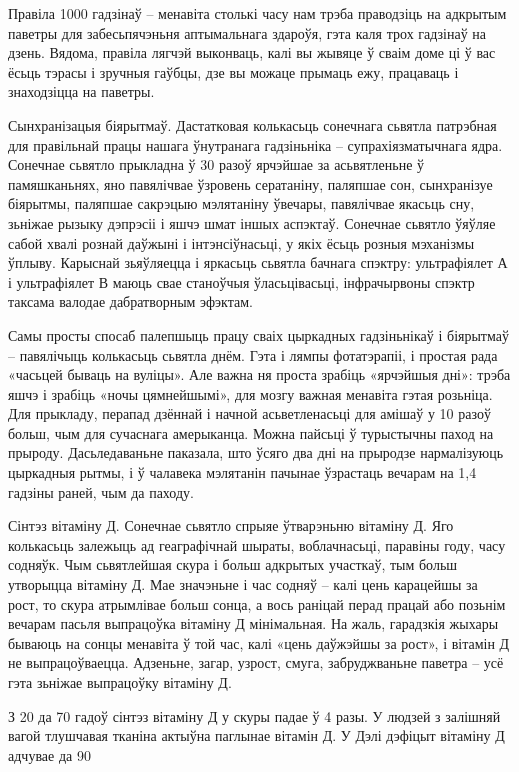 Правіла 1000 гадзінаў – менавіта столькі часу нам трэба праводзіць на адкрытым паветры для забесьпячэньня аптымальнага здароўя, гэта каля трох гадзінаў на дзень. Вядома, правіла лягчэй выконваць, калі вы жывяце ў сваім доме ці ў вас ёсьць тэрасы і зручныя гаўбцы, дзе вы можаце прымаць ежу, працаваць і знаходзіцца на паветры.

Сынхранізацыя біярытмаў. Дастатковая колькасьць сонечнага сьвятла патрэбная для правільнай працы нашага ўнутранага гадзіньніка – супрахіязматычнага ядра. Сонечнае сьвятло прыкладна ў 30 разоў ярчэйшае за асьвятленьне ў памяшканьнях, яно павялічвае ўзровень сератаніну, паляпшае сон, сынхранізуе біярытмы, паляпшае сакрэцыю мэлятаніну ўвечары, павялічвае якасьць сну, зьніжае рызыку дэпрэсіі і яшчэ шмат іншых аспэктаў. Сонечнае сьвятло ўяўляе сабой хвалі рознай даўжыні і інтэнсіўнасьці, у якіх ёсьць розныя мэханізмы ўплыву. Карыснай зьяўляецца і яркасьць сьвятла бачнага спэктру: ультрафіялет А і ультрафіялет В маюць свае станоўчыя ўласьцівасьці, інфрачырвоны спэктр таксама валодае дабратворным эфэктам.

Самы просты спосаб палепшыць працу сваіх цыркадных гадзіньнікаў і біярытмаў – павялічыць колькасьць сьвятла днём. Гэта і лямпы фотатэрапіі, і простая рада «часьцей бываць на вуліцы». Але важна ня проста зрабіць «ярчэйшыя дні»: трэба яшчэ і зрабіць «ночы цямнейшымі», для мозгу важная менавіта гэтая розьніца. Для прыкладу, перапад дзённай і начной асьветленасьці для амішаў у 10 разоў больш, чым для сучаснага амерыканца. Можна пайсьці ў турыстычны паход на прыроду. Дасьледаваньне паказала, што ўсяго два дні на прыродзе нармалізуюць цыркадныя рытмы, і ў чалавека мэлятанін пачынае ўзрастаць вечарам на 1,4 гадзіны раней, чым да паходу.

Сінтэз вітаміну Д. Сонечнае сьвятло спрыяе ўтварэньню вітаміну Д. Яго колькасьць залежыць ад геаграфічнай шыраты, воблачнасьці, паравіны году, часу содняўк. Чым сьвятлейшая скура і больш адкрытых участкаў, тым больш утворыцца вітаміну Д. Мае значэньне і час содняў – калі цень карацейшы за рост, то скура атрымлівае больш сонца, а вось раніцай перад працай або позьнім вечарам пасьля выпрацоўка вітаміну Д мінімальная. На жаль, гарадзкія жыхары бываюць на сонцы менавіта ў той час, калі «цень даўжэйшы за рост», і вітамін Д не выпрацоўваецца. Адзеньне, загар, узрост, смуга, забруджваньне паветра – усё гэта зьніжае выпрацоўку вітаміну Д.

З 20 да 70 гадоў сінтэз вітаміну Д у скуры падае ў 4 разы. У людзей з залішняй вагой тлушчавая тканіна актыўна паглынае вітамін Д. У Дэлі дэфіцыт вітаміну Д адчувае да 90%


